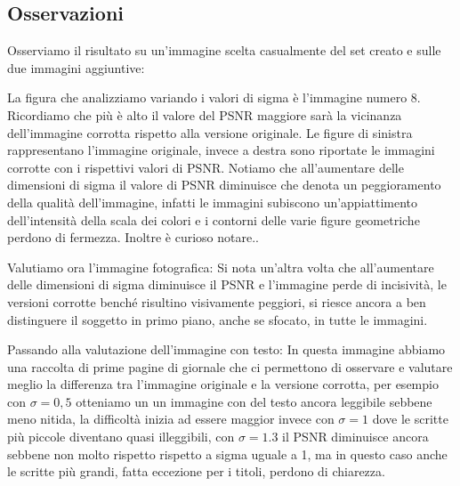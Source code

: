 \subsection{Osservazioni}

Osserviamo il risultato su un'immagine scelta casualmente del set creato e sulle due immagini aggiuntive: 

La figura che analizziamo variando i valori di sigma è l'immagine numero 8. 
Ricordiamo che più è alto il valore del PSNR maggiore sarà la vicinanza dell'immagine corrotta rispetto alla versione originale. Le figure di sinistra rappresentano l'immagine originale, invece a destra sono riportate le immagini corrotte con i rispettivi valori di PSNR. Notiamo che all'aumentare delle dimensioni di sigma il valore di PSNR diminuisce che denota un peggioramento della qualità dell'immagine, infatti le immagini subiscono un'appiattimento dell'intensità della scala dei colori e i contorni delle varie figure geometriche perdono di fermezza. Inoltre è curioso notare..

Valutiamo ora l'immagine fotografica: 
Si nota un'altra volta che all'aumentare delle dimensioni di sigma diminuisce il PSNR e l'immagine perde di incisività, le versioni corrotte benché risultino visivamente peggiori, si riesce ancora a ben distinguere il soggetto in primo piano, anche se sfocato, in tutte le immagini. 

Passando alla valutazione dell'immagine con testo:
In questa immagine abbiamo una raccolta di prime pagine di giornale che ci permettono di osservare e valutare meglio la differenza tra l'immagine originale e la versione corrotta, per esempio con $\sigma = 0,5$ otteniamo un un immagine con del testo ancora leggibile sebbene meno nitida, la difficoltà inizia ad essere maggior invece con $\sigma = 1$ dove le scritte più piccole diventano quasi illeggibili, con $\sigma = 1.3$ il PSNR diminuisce ancora sebbene non molto rispetto rispetto a sigma uguale a 1, ma in questo caso anche le scritte più grandi, fatta eccezione per i titoli, perdono di chiarezza. 
